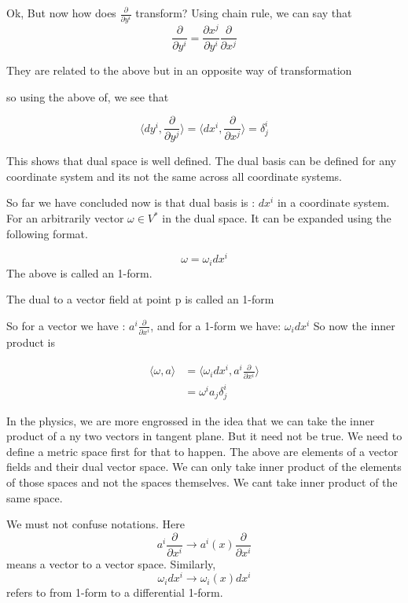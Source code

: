 \documentclass{article}
\begin{document}
Ok, But now how does \( \frac{\partial}{\partial y^i} \) transform? Using chain rule, we can say that 
\[ \frac{\partial}{\partial y^i} = \frac{\partial x^j}{\partial y^i} \frac{\partial}{\partial x^j} \]

They are related to the above but in an opposite way of transformation 

so using the above of, we see that 

\[ \langle dy^i, \frac{\partial}{\partial y^j} \rangle = \langle dx^i, \frac{\partial}{\partial x^j} \rangle = \delta^i_j \] 

This shows that dual space is well defined. The dual basis can be defined for any coordinate system and its not the same across all coordinate systems. 

So far we have concluded now is that dual basis is : \( dx^i \) in a coordinate system. For an arbitrarily vector \( \omega \in V^{*} \) in the dual space. It can be expanded using the following format.  

\[ \omega = \omega_i dx^i \]
The above is called an 1-form.  

\begin{theorem}
    The dual to a vector field at point p is called an 1-form
\end{theorem}

So for a vector we have : \( a^i \frac{\partial}{\partial x^i} \), and for a 1-form we have: \( \omega_i dx^i \)
So now the inner product is 

\begin{align*}
 \langle \omega, a \rangle &= \langle \omega_i dx^i, a^i \frac{\partial}{\partial x^i} \rangle \\ 
                           &= \omega^i a_j \delta^i_j
\end{align*}

In the physics, we are more engrossed in the idea that we can take the inner product of a ny two vectors in tangent plane. But it need not be true. We need to define a metric space first for that to happen. The above are elements of a vector fields and their dual vector space. We can only take inner product of the elements of those spaces and not the spaces themselves. We cant take inner product of the same space. 

We must not confuse notations. Here \[ a^i \frac{\partial}{\partial x^i} \to a^i(x) \frac{\partial}{\partial x^i} \] means a vector to a vector space. Similarly, 
\[ \omega_i dx^i \to \omega_i(x) dx^i \] refers to from 1-form to a differential 1-form.  
\end{document}
